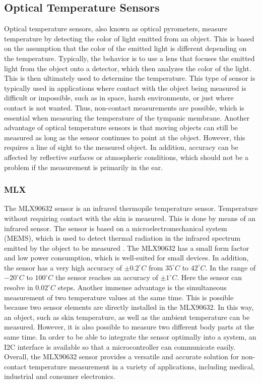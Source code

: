 \subsection{Optical Temperature Sensors}
\label{Background:TemperatureSensors:OpticalTS}
Optical temperature sensors, also known as optical pyrometers, measure temperature by detecting the color of light emitted from an object. 
This is based on the assumption that the color of the emitted light is different depending on the temperature.
Typically, the behavior is to use a lens that focuses the emitted light from the object onto a detector, which then analyzes the color of the light. 
This is then ultimately used to determine the temperature.
This type of sensor is typically used in applications where contact with the object being measured is difficult or impossible, such as in space, harsh environments, or just where contact is not wanted.
Thus, non-contact measurements are possible, which is essential when measuring the temperature of the tympanic membrane.
Another advantage of optical temperature sensors is that moving objects can still be measured as long as the sensor continues to point at the object.
However, this requires a line of sight to the measured object.
In addition, accuracy can be affected by reflective surfaces or atmospheric conditions, which should not be a problem if the measurement is primarily in the ear.

\subsubsection{MLX}
\label{Background:TemperatureSensors:OpticalTS:MLX}
The MLX90632 sensor is an infrared thermopile temperature sensor.
Temperature without requiring contact with the skin is measured. 
This is done by means of an infrared sensor. 
The sensor is based on a microelectromechanical system (MEMS), which is used to detect thermal radiation in the infrared spectrum emitted by the object to be measured \cite{melexisMLX90632FIRSensor2021}.
The MLX90632 has a small form factor and low power consumption, which is well-suited for small devices.
In addition, the sensor has a very high accuracy of $\pm 0.2 ^\circ C$ from $35 ^\circ C$  to $42 ^\circ C$.
In the range of $-20 ^\circ C$  to $100 ^\circ C$ the sensor reaches an accuracy of $\pm 1 ^\circ C$.
Here the sensor can resolve in $0.02 ^\circ C$ steps.
Another immense advantage is the simultaneous measurement of two temperature values at the same time.
This is possible because two sensor elements are directly installed in the MLX90632.
In this way, an object, such as skin temperature, as well as the ambient temperature can be measured.
However, it is also possible to measure two different body parts at the same time.
In order to be able to integrate the sensor optimally into a system, an I2C interface is available so that a microcontroller can communicate easily.
Overall, the MLX90632 sensor provides a versatile and accurate solution for non-contact temperature measurement in a variety of applications, including medical, industrial and consumer electronics.

